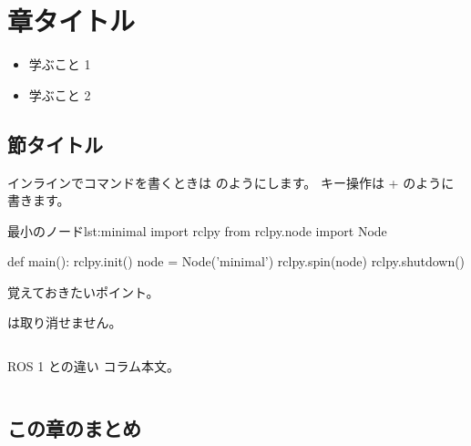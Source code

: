 
\chapter{章タイトル}
\label{chap:example}

\begin{goalbox}
  \begin{itemize}
    \item 学ぶこと 1
    \item 学ぶこと 2
  \end{itemize}
\end{goalbox}

\section{節タイトル}

インラインでコマンドを書くときは  のようにします。
キー操作は + のように書きます。


\begin{codelisting}[style=python]{最小のノード}{lst:minimal}
import rclpy
from rclpy.node import Node

def main():
    rclpy.init()
    node = Node('minimal')
    rclpy.spin(node)
    rclpy.shutdown()
\end{codelisting}

% 

\begin{point}
  覚えておきたいポイント。
\end{point}

\begin{caution}[rm コマンドは取り消せない]
   は取り消せません。
\end{caution}

\begin{column}{ROS 1 との違い}
  コラム本文。
\end{column}



\section*{この章のまとめ}

